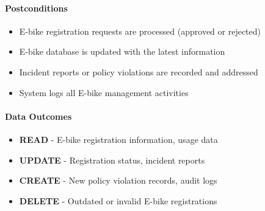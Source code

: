 \paragraph{Postconditions}
\begin{itemize}
    \item E-bike registration requests are processed (approved or rejected)
    \item E-bike database is updated with the latest information
    \item Incident reports or policy violations are recorded and addressed
    \item System logs all E-bike management activities
\end{itemize}

\paragraph{Data Outcomes}
\begin{itemize}
    \item \textbf{READ} - E-bike registration information, usage data
    \item \textbf{UPDATE} - Registration status, incident reports
    \item \textbf{CREATE} - New policy violation records, audit logs
    \item \textbf{DELETE} - Outdated or invalid E-bike registrations
\end{itemize}


